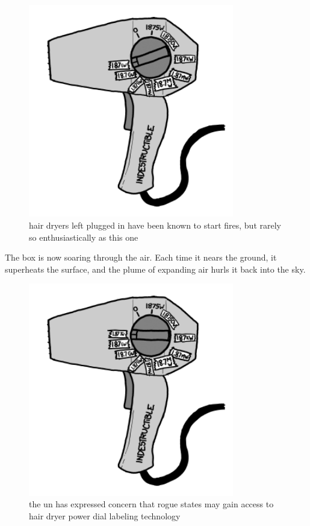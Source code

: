\begin{figure}[!htbp]
\centering
\includegraphics[scale=0.5, max width=0.8\textwidth]{imgs/a/35/hair_dryer_1e11.png}
\caption{hair dryers left plugged in have been known to start fires, but rarely so enthusiastically as this one}
\end{figure}

{The box is now soaring through the air. Each time it nears the ground, it superheats the surface, and the plume of expanding air hurls it back into the sky.}

\begin{figure}[!htbp]
\centering
\includegraphics[scale=0.5, max width=0.8\textwidth]{imgs/a/35/hair_dryer_1e12.png}
\caption{the un has expressed concern that rogue states may gain access to hair dryer power dial labeling technology}
\end{figure}

